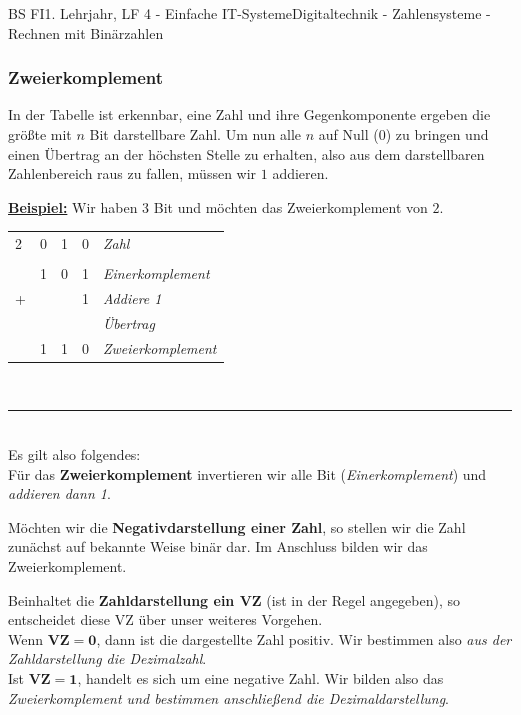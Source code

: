 \documentclass[11pt,twocolumn,oneside,openany,headings=optiontotoc,11pt,numbers=noenddot]{article}
\begin{document}
\begin{worksheet}{BS FI}{1. Lehrjahr, LF 4 - Einfache IT-Systeme}{Digitaltechnik - Zahlensysteme - Rechnen mit Binärzahlen}
		\subsubsection*{Zweierkomplement}
		In der Tabelle ist erkennbar, eine Zahl und ihre Gegenkomponente ergeben die größte mit \(n\) Bit darstellbare Zahl. Um nun alle \(n\) auf Null (0) zu bringen und einen Übertrag an der höchsten Stelle zu erhalten, also aus dem darstellbaren Zahlenbereich raus zu fallen, müssen wir \(1\) addieren.\\\par\noindent
		\textbf{\underline{Beispiel:}} Wir haben 3 Bit und möchten das Zweierkomplement von \(2\).\\
		\par\noindent
		\begin{tabularx}{0.48\textwidth}{l|cccl}
			2 & 0 & 1 & 0 & \textit{\small{Zahl}}\\
			\cline{1-5}
			\\
			& 1 & 0 & 1 & \textit{\small{Einerkomplement}}\normalsize\\
			+ & & & 1 & \textit{\small{Addiere 1}}\normalsize\\
			& & \color{codegray}{\tiny{1}} & & \textit{\tiny{Übertrag}}\\
			\cline{1-5}\normalcolor\normalsize
			& 1 & 1 & 0 & \textit{\small{Zweierkomplement}}\normalsize
		\end{tabularx}\\
		\par\noindent
		\rule{0.48\textwidth}{0.1pt}\\
		Es gilt also folgendes:\\
		Für das \textbf{Zweierkomplement} invertieren wir alle Bit (\textit{Einerkomplement}) und \textit{addieren dann 1}.\\
		\par\noindent
		Möchten wir die \textbf{Negativdarstellung einer Zahl}, so stellen wir die Zahl zunächst auf bekannte Weise binär dar. Im Anschluss bilden wir das Zweierkomplement.\\
		\par\noindent
		Beinhaltet die \textbf{Zahldarstellung ein VZ} (ist in der Regel angegeben), so entscheidet diese VZ über unser weiteres Vorgehen.\\
		Wenn \(\mathbf{VZ = 0}\), dann ist die dargestellte Zahl positiv. Wir bestimmen also \textit{aus der Zahldarstellung die Dezimalzahl}.\\
		Ist \(\mathbf{VZ = 1}\), handelt es sich um eine negative Zahl. Wir bilden also das \textit{Zweierkomplement und bestimmen anschließend die Dezimaldarstellung}.\\

\end{worksheet}
\end{document}
